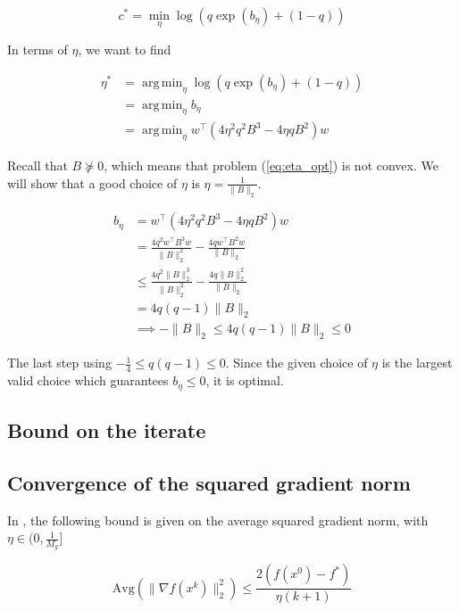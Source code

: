 \documentclass[11pt]{article}
\DeclareMathOperator*{\argmin}{arg\,min}
\begin{document}
\begin{equation}
    c^* = \min_{\eta} \log( q \exp(b_\eta ) + (1 - q))
\end{equation}

In terms of $\eta$, we want to find

\begin{equation}
\label{eq:eta_opt}
\begin{split}
    \eta^* &= \argmin_{\eta} \log( q \exp(b_\eta ) + (1 - q)) \\
    &= \argmin_{\eta} b_\eta \\
    &= \argmin_{\eta} w^{\top} ( 4 \eta^2 q^2 B^3 - 4 \eta q B^2)w
\end{split}
\end{equation}

Recall that $B \nsucceq 0$, which means that problem (\ref{eq:eta_opt}) is not convex. We will show that a good choice of $\eta$ is $\eta = \frac{1}{\|B\|_2}$.

\begin{align*}
    b_\eta &= w^{\top} ( 4 \eta^2 q^2 B^3 - 4 \eta q B^2)w \\
    &= \frac{4 q^2 w^{\top} B^3 w}{\|B\|_2^2} - \frac{4 q w^{\top} B^2 w}{\|B\|_2} \\
    &\leq \frac{4 q^2 \|B\|_2^3}{\|B\|_2^2} - \frac{4 q \|B\|_2^2 }{\|B\|_2} \\
    &= 4 q (q-1) \|B\|_2 \\
    &\implies -\|B\|_2 \leq 4 q (q-1) \|B\|_2 \leq 0
\end{align*}

The last step using $-\frac{1}{4} \leq q (q-1) \leq 0$. Since the given choice of $\eta$ is the largest valid choice which guarantees $b_\eta \leq 0$, it is optimal.

\subsection{Bound on the iterate}

\subsection{Convergence of the squared gradient norm}

In \cite{khamaru_convergence_2018}, the following bound is given on the average squared gradient norm, with $\eta \in (0, \frac{1}{M_g}]$

\begin{equation}
    \textrm{Avg}(\|\nabla f(x^k) \|_2^2) \leq \frac{2(f(x^0) - f^*)}{\eta(k + 1)}
\end{equation}
\end{document}
